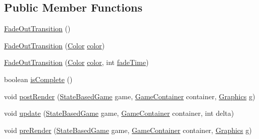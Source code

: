 \subsection*{Public Member Functions}
\begin{DoxyCompactItemize}
\item 
\mbox{\hyperlink{classorg_1_1newdawn_1_1slick_1_1state_1_1transition_1_1_fade_out_transition_acf33df48dc7720656301aaf0efc64c0d}{Fade\+Out\+Transition}} ()
\item 
\mbox{\hyperlink{classorg_1_1newdawn_1_1slick_1_1state_1_1transition_1_1_fade_out_transition_ae16edb20ef2819972b8625537d5e5b33}{Fade\+Out\+Transition}} (\mbox{\hyperlink{classorg_1_1newdawn_1_1slick_1_1_color}{Color}} \mbox{\hyperlink{classorg_1_1newdawn_1_1slick_1_1state_1_1transition_1_1_fade_out_transition_a71c42f67f13c8572900a197aef96aa90}{color}})
\item 
\mbox{\hyperlink{classorg_1_1newdawn_1_1slick_1_1state_1_1transition_1_1_fade_out_transition_a401ba29c3ba312a1436389e8dc80138d}{Fade\+Out\+Transition}} (\mbox{\hyperlink{classorg_1_1newdawn_1_1slick_1_1_color}{Color}} \mbox{\hyperlink{classorg_1_1newdawn_1_1slick_1_1state_1_1transition_1_1_fade_out_transition_a71c42f67f13c8572900a197aef96aa90}{color}}, int \mbox{\hyperlink{classorg_1_1newdawn_1_1slick_1_1state_1_1transition_1_1_fade_out_transition_ad34428b2e0502b887e293c1db61fe979}{fade\+Time}})
\item 
boolean \mbox{\hyperlink{classorg_1_1newdawn_1_1slick_1_1state_1_1transition_1_1_fade_out_transition_a798425e8d39823af0dac48ab0831bad4}{is\+Complete}} ()
\item 
void \mbox{\hyperlink{classorg_1_1newdawn_1_1slick_1_1state_1_1transition_1_1_fade_out_transition_a7e5dacd1888317dd8ccaee8d216890dc}{post\+Render}} (\mbox{\hyperlink{classorg_1_1newdawn_1_1slick_1_1state_1_1_state_based_game}{State\+Based\+Game}} game, \mbox{\hyperlink{classorg_1_1newdawn_1_1slick_1_1_game_container}{Game\+Container}} container, \mbox{\hyperlink{classorg_1_1newdawn_1_1slick_1_1_graphics}{Graphics}} g)
\item 
void \mbox{\hyperlink{classorg_1_1newdawn_1_1slick_1_1state_1_1transition_1_1_fade_out_transition_a0005911f18fd8a8442cda0fdd92f1e1b}{update}} (\mbox{\hyperlink{classorg_1_1newdawn_1_1slick_1_1state_1_1_state_based_game}{State\+Based\+Game}} game, \mbox{\hyperlink{classorg_1_1newdawn_1_1slick_1_1_game_container}{Game\+Container}} container, int delta)
\item 
void \mbox{\hyperlink{classorg_1_1newdawn_1_1slick_1_1state_1_1transition_1_1_fade_out_transition_af23dc84a0a07121f8f4ec307fdb578b2}{pre\+Render}} (\mbox{\hyperlink{classorg_1_1newdawn_1_1slick_1_1state_1_1_state_based_game}{State\+Based\+Game}} game, \mbox{\hyperlink{classorg_1_1newdawn_1_1slick_1_1_game_container}{Game\+Container}} container, \mbox{\hyperlink{classorg_1_1newdawn_1_1slick_1_1_graphics}{Graphics}} g)

\end{DoxyCompactItemize}
